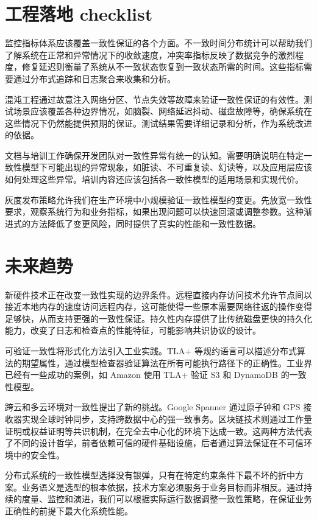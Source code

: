 \chapter{工程落地 checklist}
监控指标体系应该覆盖一致性保证的各个方面。不一致时间分布统计可以帮助我们了解系统在正常和异常情况下的收敛速度，冲突率指标反映了数据竞争的激烈程度，修复延迟则衡量了系统从不一致状态恢复到一致状态所需的时间。这些指标需要通过分布式追踪和日志聚合来收集和分析。\par
混沌工程通过故意注入网络分区、节点失效等故障来验证一致性保证的有效性。测试场景应该覆盖各种边界情况，如脑裂、网络延迟抖动、磁盘故障等，确保系统在这些情况下仍然能提供预期的保证。测试结果需要详细记录和分析，作为系统改进的依据。\par
文档与培训工作确保开发团队对一致性异常有统一的认知。需要明确说明在特定一致性模型下可能出现的异常现象，如脏读、不可重复读、幻读等，以及应用层应该如何处理这些异常。培训内容还应该包括各一致性模型的适用场景和实现代价。\par
灰度发布策略允许我们在生产环境中小规模验证一致性模型的变更。先放宽一致性要求，观察系统行为和业务指标，如果出现问题可以快速回滚或调整参数。这种渐进式的方法降低了变更风险，同时提供了真实的性能和一致性数据。\par
\chapter{未来趋势}
新硬件技术正在改变一致性实现的边界条件。远程直接内存访问技术允许节点间以接近本地内存的速度访问远程内存，这可能使得一些原本需要网络往返的操作变得足够快，从而支持更强的一致性保证。持久性内存提供了比传统磁盘更快的持久化能力，改变了日志和检查点的性能特征，可能影响共识协议的设计。\par
可验证一致性将形式化方法引入工业实践。TLA+ 等规约语言可以描述分布式算法的期望属性，通过模型检查器验证算法在所有可能执行路径下的正确性。工业界已经有一些成功的案例，如 Amazon 使用 TLA+ 验证 S3 和 DynamoDB 的一致性模型。\par
跨云和多云环境对一致性提出了新的挑战。Google Spanner 通过原子钟和 GPS 接收器实现全球时钟同步，支持跨数据中心的强一致事务。区块链技术则通过工作量证明或权益证明等共识机制，在完全去中心化的环境下达成一致。这两种方法代表了不同的设计哲学，前者依赖可信的硬件基础设施，后者通过算法保证在不可信环境中的安全性。\par
分布式系统的一致性模型选择没有银弹，只有在特定约束条件下最不坏的折中方案。业务语义是选型的根本依据，技术方案必须服务于业务目标而非相反。通过持续的度量、监控和演进，我们可以根据实际运行数据调整一致性策略，在保证业务正确性的前提下最大化系统性能。\par
